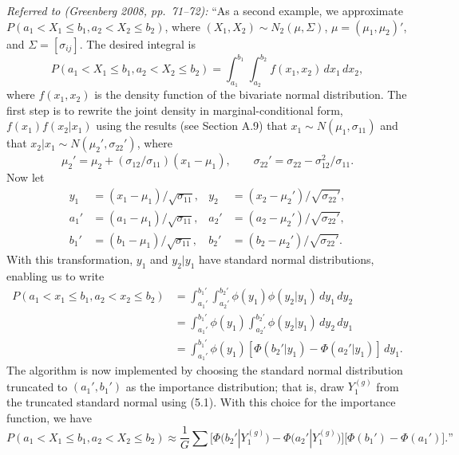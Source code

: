 \documentclass[11pt,a4paper]{article}
\numberwithin{equation}{questao}   %
\newcommand{\1}{\mathbf{1}}
\begin{document}
\emph{Referred to (Greenberg 2008, pp.~71--72):} ``As a second example, we approximate
$P(a_1<X_1\le b_1,a_2<X_2\le b_2)$, where $(X_1,X_2)\sim N_2(\mu,\Sigma)$, $\mu=(\mu_1,\mu_2)'$, and
$\Sigma=[\sigma_{ij}]$. The desired integral is
\[
P(a_1<X_1\le b_1,a_2<X_2\le b_2)=\int_{a_1}^{b_1}\int_{a_2}^{b_2}f(x_1,x_2)\,dx_1\,dx_2,
\]
where $f(x_1,x_2)$ is the density function of the bivariate normal distribution. The first step is
to rewrite the joint density in marginal-conditional form, $f(x_1)f(x_2|x_1)$ using the results (see
Section A.9) that $x_1\sim N(\mu_1,\sigma_{11})$ and that $x_2|x_1\sim N(\mu_2',\sigma_{22}')$, where
\[
\mu_2'=\mu_2+(\sigma_{12}/\sigma_{11})(x_1-\mu_1),\qquad \sigma_{22}'=\sigma_{22}-\sigma_{12}^2/\sigma_{11}.
\]
Now let
\begin{align*}
y_1&=(x_1-\mu_1)/\sqrt{\sigma_{11}}, & y_2&=(x_2-\mu_2')/\sqrt{\sigma_{22}'},\\
a_1'&=(a_1-\mu_1)/\sqrt{\sigma_{11}}, & a_2'&=(a_2-\mu_2')/\sqrt{\sigma_{22}'},\\
b_1'&=(b_1-\mu_1)/\sqrt{\sigma_{11}}, & b_2'&=(b_2-\mu_2')/\sqrt{\sigma_{22}'}.
\end{align*}
With this transformation, $y_1$ and $y_2|y_1$ have standard normal distributions, enabling us to write
\begin{align*}
P(a_1<x_1\le b_1,a_2<x_2\le b_2)&=\int_{a_1'}^{b_1'}\int_{a_2'}^{b_2'}\phi(y_1)\phi(y_2|y_1)\,dy_1\,dy_2\\
&=\int_{a_1'}^{b_1'}\phi(y_1)\int_{a_2'}^{b_2'}\phi(y_2|y_1)\,dy_2\,dy_1\\
&=\int_{a_1'}^{b_1'}\phi(y_1)[\Phi(b_2'|y_1)-\Phi(a_2'|y_1)]\,dy_1.
\end{align*}
The algorithm is now implemented by choosing the standard normal distribution truncated to
$(a_1',b_1')$ as the importance distribution; that is, draw $Y_1^{(g)}$ from the truncated standard
normal using (5.1). With this choice for the importance function, we have
\[
P(a_1<X_1\le b_1,a_2<X_2\le b_2)\approx\frac1G\sum\big[\Phi\big(b_2'|Y_1^{(g)}\big)-\Phi\big(a_2'|Y_1^{(g)}\big)\big]\big[\Phi(b_1')-\Phi(a_1')\big].\text{''}\tag{5.3}
\]
\end{document}
